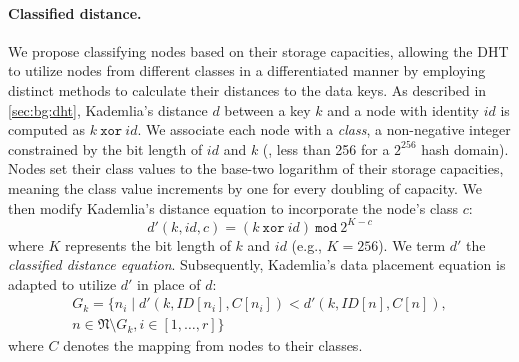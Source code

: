\paragraph{Classified distance.}
 
We propose classifying nodes based on their storage capacities, allowing the DHT to utilize nodes from different classes in a differentiated manner by employing distinct methods to calculate their distances to the data keys.
As described in \autoref{sec:bg:dht}, Kademlia's distance $d$ between a key $k$ and a node with identity $id$ is computed as $k\ \texttt{xor}\ id$.
We associate each node with a \emph{class}, a non-negative integer constrained by the bit length of $id$ and $k$ (\eg, less than 256 for a $2^{256}$ hash domain).
Nodes set their class values to the base-two logarithm of their storage capacities, meaning the class value increments by one for every doubling of capacity.
We then modify Kademlia's distance equation to incorporate the node's class $c$:
\[
    d'(k, id, c)=(k\ \texttt{xor}\ id)\ \texttt{mod}\ 2^{K-c}
\]
where $K$ represents the bit length of $k$ and $id$ (e.g., $K=256$).
We term $d'$ the \emph{classified distance equation}.
Subsequently, Kademlia's data placement equation is adapted to utilize $d'$ in place of $d$:
\begin{multline*}
    G_k=\{n_i\mid{}d'(k,ID[n_i],C[n_i])<d'(k,ID[n],C[n]),\\
    n\in{}\mathfrak{N}\setminus{}G_k,i\in{}[1,\dots,r]\}
\end{multline*}
where $C$ denotes the mapping from nodes to their classes.

